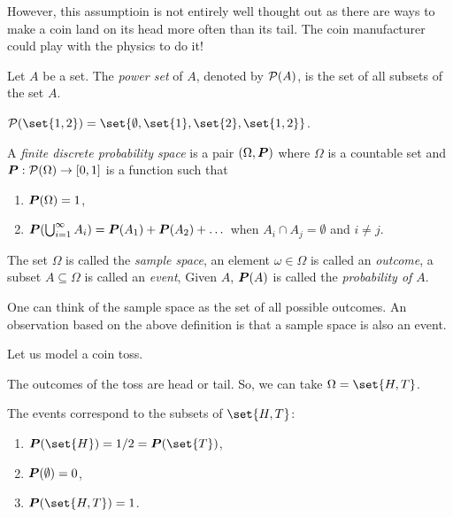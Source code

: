 However, this assumptioin is not entirely well thought out as there are ways 
to make a coin land on its head more often than its tail.
The coin manufacturer could play with the physics to do it!




\begin{definition}
    Let $A$ be a set.
    The \emph{power set} of $A$, denoted by $\cP(A)$, 
is the set of all subsets of the set $A$. 
\end{definition}

\begin{example}
            $\cP(\set{1,2}) = \set{ \emptyset, \set{1}, \set{2}, \set{1,2}} $.
\end{example}



\begin{definition}
    A \emph{finite discrete probability space} is a pair $(\Omega, \P)$
    where $\Omega$ is a countable set
    and $\P:\cP(\Omega) \to [0,1]$ is a function such that
    \begin{enumerate}
        \item $\P(\Omega) = 1$,
        \item $\P(\bigcup_{i=1}^\infty A_i) = \P(A_1) + \P(A_2) + \dots$ when $A_i\cap A_j = \emptyset$ and $i\not = j$.
    \end{enumerate}
    The set $\Omega$ is called the \emph{sample space}, 
    an element $\omega \in \Omega$ is called an \emph{outcome}, 
    a subset $A \subseteq \Omega$ is called an \emph{event},
    Given $A$, $\P(A)$ is called the \emph{probability of $A$}.
\end{definition}
One can think of the sample space as the set of all possible outcomes. 
An observation based on the above definition is that
a sample space is also an event.

\begin{example}
   Let us model a coin toss.

   The outcomes of the toss are head or tail.
   So, we can take $\Omega = \set{H,T}$.

   The events correspond to the subsets of $\set{H,T}$:
   \begin{enumerate}
       \item $\P(\set{H}) = 1/2 = \P(\set{T})$,
       \item $\P(\emptyset) = 0$,
       \item $\P(\set{H,T}) = 1$.
   \end{enumerate}
\end{example}

